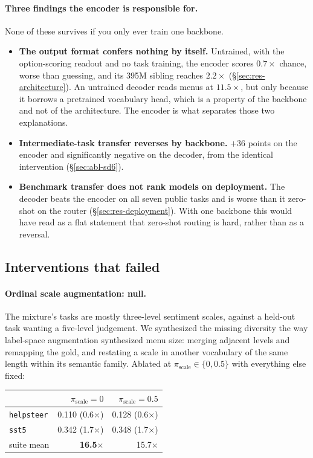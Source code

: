 \paragraph{Three findings the encoder is responsible for.} None of these
survives if you only ever train one backbone.

\begin{itemize}[leftmargin=1.4em,itemsep=0.3em]
  \item \textbf{The output format confers nothing by itself.} Untrained,
    with the option-scoring readout and no task training, the encoder
    scores $0.7\times$ chance, worse than guessing, and its 395M sibling
    reaches $2.2\times$ (\S\ref{sec:res-architecture}). An untrained
    decoder reads menus at $11.5\times$, but only because it borrows a
    pretrained vocabulary head, which is a property of the backbone and
    not of the architecture. The encoder is what separates those two
    explanations.
  \item \textbf{Intermediate-task transfer reverses by backbone.}
    $+36$ points on the encoder and significantly negative on the
    decoder, from the identical intervention (\S\ref{sec:abl-sd6}).
  \item \textbf{Benchmark transfer does not rank models on deployment.}
    The decoder beats the encoder on all seven public tasks and is worse
    than it zero-shot on the router (\S\ref{sec:res-deployment}). With
    one backbone this would have read as a flat statement that zero-shot
    routing is hard, rather than as a reversal.
\end{itemize}

\subsection{Interventions that failed}

\paragraph{Ordinal scale augmentation: null.}
The mixture's \score{} tasks are mostly three-level sentiment scales,
against a held-out task wanting a five-level judgement. We synthesized the
missing diversity the way label-space augmentation synthesized menu size:
merging adjacent levels and remapping the gold, and restating a scale in
another vocabulary of the same length within its semantic family. Ablated
at $\pi_{\text{scale}} \in \{0, 0.5\}$ with everything else fixed:

\begin{center}
\begin{tabular}{lrr}
\toprule
 & $\pi_{\text{scale}}{=}0$ & $\pi_{\text{scale}}{=}0.5$ \\
\midrule
\texttt{helpsteer} & 0.110 (0.6$\times$) & 0.128 (0.6$\times$) \\
\texttt{sst5}      & 0.342 (1.7$\times$) & 0.348 (1.7$\times$) \\
suite mean         & \textbf{16.5$\times$} & 15.7$\times$ \\
\bottomrule
\end{tabular}
\end{center}

